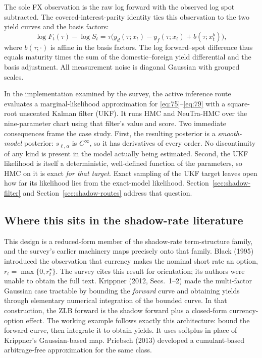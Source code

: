 \documentclass[11pt]{article}
\begin{document}
The sole FX observation is the raw log forward with the observed log spot subtracted. The covered-interest-parity identity ties this observation to the two yield curves and the basis factors:
\begin{equation}\label{eq:79}
 \log F_t(\tau)-\log S_t=\tau\bigl(
 y_d(\tau;x_t)-y_f(\tau;x_t)+b(\tau;x_t^b)\bigr),
\end{equation}
where \(b(\tau;\cdot)\) is affine in the basis factors. The log forward--spot difference thus equals maturity times the sum of the domestic--foreign yield differential and the basis adjustment. All measurement noise is diagonal Gaussian with grouped scales.

In the implementation examined by the survey, the active inference route evaluates a marginal-likelihood approximation for \eqref{eq:75}--\eqref{eq:79} with a square-root unscented Kalman filter (UKF). It runs HMC and NeuTra-HMC over the nine-parameter chart using that filter's value and score. Two immediate consequences frame the case study. First, the resulting posterior is a \emph{smooth-model} posterior: \(s_{\ell,\alpha}\) is \(C^\infty\), so it has derivatives of every order. No discontinuity of any kind is present in the model actually being estimated. Second, the UKF likelihood is itself a deterministic, well-defined function of the parameters, so HMC on it is exact \emph{for that target}. Exact sampling of the UKF target leaves open how far its likelihood lies from the exact-model likelihood. Section~\ref{sec:shadow-filter} and Section~\ref{sec:shadow-routes} address that question.

\subsection{Where this sits in the shadow-rate literature}
\label{sec:shadow-lit}

This design is a reduced-form member of the shadow-rate term-structure family, and the survey's earlier machinery maps precisely onto that family. Black (1995) introduced the observation that currency makes the nominal short rate an option, \(r_t=\max\{0,r_t^\star\}\). The survey cites this result for orientation; its authors were unable to obtain the full text. Krippner (2012, Secs.~1--2) made the multi-factor Gaussian case tractable by bounding the \emph{forward} curve and obtaining yields through elementary numerical integration of the bounded curve. In that construction, the ZLB forward is the shadow forward plus a closed-form currency-option effect. The working example follows exactly this architecture: bound the forward curve, then integrate it to obtain yields. It uses softplus in place of Krippner's Gaussian-based map. Priebsch (2013) developed a cumulant-based arbitrage-free approximation for the same class.
\end{document}
